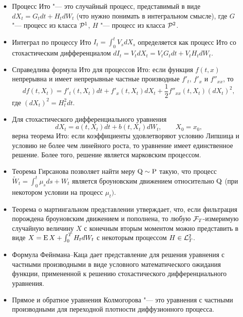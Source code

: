 \begin{itemize}
\item Процесс Ито "--- это случайный процесс, представимый в виде $dX_t = G_t dt + H_t d W_t$ (что нужно понимать в интегральном смысле), где $G$ "--- процесс из класса $\mathcal{P}^1$, $H$ "--- процесс из класса $\mathcal{P}^2$.

\item Интеграл по процессу Ито $I_t = \int_0^t V_s d X_s$ определяется как процесс Ито со стохастическим дифференциалом $d I_t = V_td X_t = V_t G_t dt + V_t H_t dW_t$.

\item Справедлива формула Ито для процессов Ито: если функция $f(t,x)$ непрерывна и имеет непрерывные частные производные $f'_t$, $f'_x$ и $f''_{xx}$, то 
\[
d f(t,X_t) = f'_t(t,X_t) dt + f'_x(t,X_t) dX_t + \frac12 f''_{xx}(t,X_t) (dX_t)^2,
\] 
где $(dX_t)^2 = H_t^2 dt$.

\item Для стохастического дифференциального уравнения
\[
dX_t = a(t,X_t) dt + b(t,X_t) dW_t, \qquad X_0 = x_0,
\]
верна теорема Ито: если коэффициенты удовлетворяют условию Липшица и условию не более чем линейного роста, то уравнение имеет единственное решение. Более того, решение является марковским процессом.

\item Теорема Гирсанова позволяет найти меру $\mathrm{Q}\sim\mathrm{P}$ такую, что процесс $\tilde W_t = \int_0^t\mu_s ds + W_t$ является броуновским движением относительно $\mathrm{Q}$ (при некотором условии на процесс $\mu_t)$.

\item Теорема о мартингальном представлении утверждает, что, если фильтрация порождена броуновским движением и пополнена, то любую $\mathcal{F}_T$-измеримую случайную величину $X$ с конечным вторым моментом можно представить в виде $X = \operatorname{E} X + \int_0^T H_t d W_t$ с некоторым процессом $H\in \mathcal{L}^2_T$.

\item Формула Фейнмана--Каца дает представление для решения уравнения с частными производными в виде условного математического ожидания функции, примененной к решению стохастического дифференциального уравнения.

\item Прямое и обратное уравнения Колмогорова "--- это уравнения с частными производными для переходной плотности диффузионного процесса.
\end{itemize}
